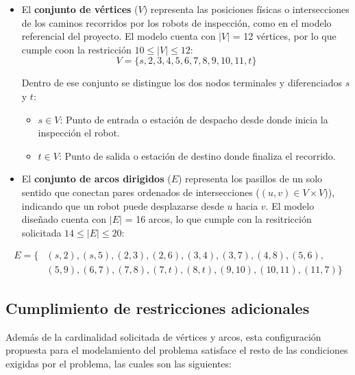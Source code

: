 \documentclass[12pt,a4paper]{article}
\providecommand{\tightlist}{\setlength{\itemsep}{0pt}\setlength{\parskip}{0pt}}
\begin{document}
\begin{itemize}
\item
  El \textbf{conjunto de vértices} (\(V\)) representa las posiciones físicas o intersecciones de los caminos recorridos por los robots de inspección, como en el modelo referencial del proyecto. El modelo cuenta con \(|V|\) = 12 vértices, por lo que cumple coon la restricción \(10 \le \vert{}V\vert{} \le 12\): \[V = \{s, 2, 3, 4, 5, 6, 7, 8, 9, 10, 11, t\}\]

  Dentro de ese conjunto se distingue los dos nodos terminales y diferenciados \(s\) y \(t\):

  \begin{itemize}
  \tightlist
  \item
    \(s \in V\): Punto de entrada o estación de despacho desde donde inicia la inspección el robot.
  \item
    \(t \in V\): Punto de salida o estación de destino donde finaliza el recorrido.
  \end{itemize}
\item
  El \textbf{conjunto de arcos dirigidos} (\(E\)) representa los pasillos de un solo sentido que conectan pares ordenados de intersecciones (\((u, v) \in V \times V\))), indicando que un robot puede desplazarse desde \(u\) hacia \(v\). El modelo diseñado cuenta con \(\vert{}E\vert{}\) = 16 arcos, lo que cumple con la resitricción solicitada \(14 \le \vert{}E\vert{} \le 20\):
\end{itemize}

\[\begin{aligned} E = \{ &(s,2), (s,5), (2,3), (2,6), (3,4), (3,7), (4,8), (5,6),\\ &(5,9), (6,7), (7,8), (7,t), (8,t), (9,10), (10,11), (11,7)\} \end{aligned}\]

\subsection{Cumplimiento de restricciones adicionales}\label{cumplimiento-de-restricciones-adicionales}

Además de la cardinalidad solicitada de vértices y arcos, esta configuración propuesta para el modelamiento del problema satisface el resto de las condiciones exigidas por el problema, las cuales son las siguientes:
\end{document}
